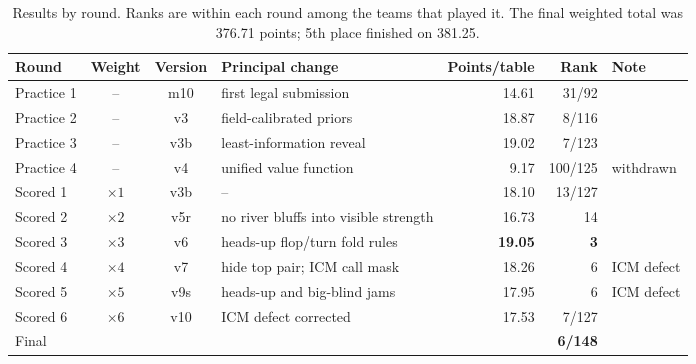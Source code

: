 \documentclass[10pt]{article}
\begin{document}
\begin{table}[!htb]
\centering\small
\begin{tabular}{lcclrr l}
\toprule
Round & Weight & Version & Principal change & Points/table & Rank & Note\\
\midrule
Practice 1 & -- & m10 & first legal submission & 14.61 & 31/92 & \\
Practice 2 & -- & v3 & field-calibrated priors & 18.87 & 8/116 & \\
Practice 3 & -- & v3b & least-information reveal & 19.02 & 7/123 & \\
Practice 4 & -- & v4 & unified value function & 9.17 & 100/125 & withdrawn\\
\midrule
Scored 1 & $\times1$ & v3b & -- & 18.10 & 13/127 & \\
Scored 2 & $\times2$ & v5r & no river bluffs into visible strength & 16.73 & 14 & \\
Scored 3 & $\times3$ & v6 & heads-up flop/turn fold rules & \textbf{19.05} & \textbf{3} & \\
Scored 4 & $\times4$ & v7 & hide top pair; ICM call mask & 18.26 & 6 & ICM defect\\
Scored 5 & $\times5$ & v9s & heads-up and big-blind jams & 17.95 & 6 & ICM defect\\
Scored 6 & $\times6$ & v10 & ICM defect corrected & 17.53 & 7/127 & \\
\midrule
Final & & & & & \textbf{6/148} & \\
\bottomrule
\end{tabular}
\caption{Results by round. Ranks are within each round among the teams that played it. The final weighted total was 376.71 points; 5th place finished on 381.25.}\label{tab:results}
\end{table}
\end{document}
